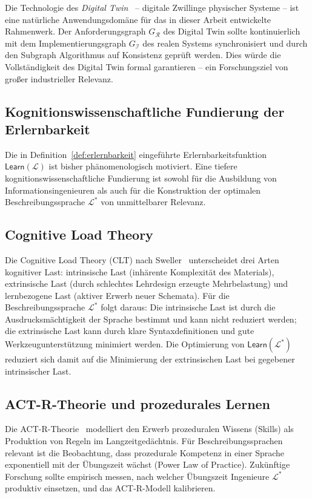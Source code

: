 ﻿\documentclass[a4paper,12pt]{report}
\theoremstyle{definition}
\begin{document}
Die Technologie des \emph{Digital Twin}~\cite{grieves2014} -- digitale Zwillinge
physischer Systeme -- ist eine natürliche Anwendungsdomäne für das in dieser Arbeit
entwickelte Rahmenwerk. Der Anforderungsgraph $G_\mathcal{R}$ des Digital Twin sollte
kontinuierlich mit dem Implementierungsgraph $G_\mathcal{I}$ des realen Systems
synchronisiert und durch den Subgraph Algorithmus auf Konsistenz geprüft werden.
Dies würde die Vollständigkeit des Digital Twin formal garantieren -- ein Forschungsziel
von großer industrieller Relevanz.

\subsection{Kognitionswissenschaftliche Fundierung der Erlernbarkeit}

Die in Definition~\ref{def:erlernbarkeit} eingeführte Erlernbarkeitsfunktion
$\mathsf{Learn}(\mathcal{L})$ ist bisher phänomenologisch motiviert. Eine tiefere
kognitionswissenschaftliche Fundierung ist sowohl für die Ausbildung von
Informationsingenieuren als auch für die Konstruktion der optimalen Beschreibungssprache
$\mathcal{L}^*$ von unmittelbarer Relevanz.

\subsection{Cognitive Load Theory}

Die Cognitive Load Theory (CLT) nach Sweller~\cite{sweller1988} unterscheidet drei
Arten kognitiver Last: intrinsische Last (inhärente Komplexität des Materials),
extrinsische Last (durch schlechtes Lehrdesign erzeugte Mehrbelastung) und lernbezogene
Last (aktiver Erwerb neuer Schemata). Für die Beschreibungssprache $\mathcal{L}^*$
folgt daraus: Die intrinsische Last ist durch die Ausdrucksmächtigkeit der Sprache
bestimmt und kann nicht reduziert werden; die extrinsische Last kann durch klare
Syntaxdefinitionen und gute Werkzeugunterstützung minimiert werden. Die Optimierung
von $\mathsf{Learn}(\mathcal{L}^*)$ reduziert sich damit auf die Minimierung der
extrinsischen Last bei gegebener intrinsischer Last.

\subsection{ACT-R-Theorie und prozedurales Lernen}

Die ACT-R-Theorie~\cite{anderson1993} modelliert den Erwerb prozeduralen Wissens
(Skills) als Produktion von Regeln im Langzeitgedächtnis. Für Beschreibungssprachen
relevant ist die Beobachtung, dass prozedurale Kompetenz in einer Sprache exponentiell
mit der Übungszeit wächst (Power Law of Practice). Zukünftige Forschung sollte
empirisch messen, nach welcher Übungszeit Ingenieure $\mathcal{L}^*$ produktiv
einsetzen, und das ACT-R-Modell kalibrieren.
\end{document}
